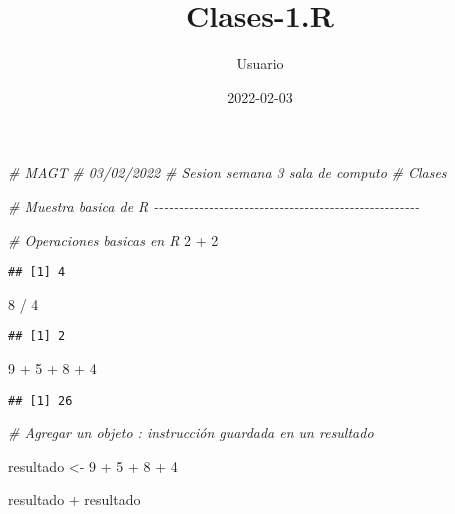 \documentclass[
]{article}
\title{Clases-1.R}
\author{Usuario}
\date{2022-02-03}
\newenvironment{Shaded}{\begin{snugshade}}{\end{snugshade}}
\newcommand{\CommentTok}[1]{\textcolor[rgb]{0.56,0.35,0.01}{\textit{#1}}}
\newcommand{\DecValTok}[1]{\textcolor[rgb]{0.00,0.00,0.81}{#1}}
\newcommand{\NormalTok}[1]{#1}
\newcommand{\OtherTok}[1]{\textcolor[rgb]{0.56,0.35,0.01}{#1}}
\newcommand{\SpecialCharTok}[1]{\textcolor[rgb]{0.00,0.00,0.00}{#1}}
\begin{document}
\maketitle

\begin{Shaded}
\begin{Highlighting}[]
\CommentTok{\# MAGT}
\CommentTok{\# 03/02/2022}
\CommentTok{\# Sesion semana 3 sala de computo }
\CommentTok{\# Clases}


\CommentTok{\# Muestra basica de R {-}{-}{-}{-}{-}{-}{-}{-}{-}{-}{-}{-}{-}{-}{-}{-}{-}{-}{-}{-}{-}{-}{-}{-}{-}{-}{-}{-}{-}{-}{-}{-}{-}{-}{-}{-}{-}{-}{-}{-}{-}{-}{-}{-}{-}{-}{-}{-}{-}{-}{-}{-}{-}}

\CommentTok{\# Operaciones basicas en R}
\DecValTok{2} \SpecialCharTok{+} \DecValTok{2} 
\end{Highlighting}
\end{Shaded}

\begin{verbatim}
## [1] 4
\end{verbatim}

\begin{Shaded}
\begin{Highlighting}[]
\DecValTok{8} \SpecialCharTok{/} \DecValTok{4}
\end{Highlighting}
\end{Shaded}

\begin{verbatim}
## [1] 2
\end{verbatim}

\begin{Shaded}
\begin{Highlighting}[]
\DecValTok{9} \SpecialCharTok{+} \DecValTok{5} \SpecialCharTok{+} \DecValTok{8} \SpecialCharTok{+} \DecValTok{4}
\end{Highlighting}
\end{Shaded}

\begin{verbatim}
## [1] 26
\end{verbatim}

\begin{Shaded}
\begin{Highlighting}[]
\CommentTok{\# Agregar un objeto : instrucción guardada en un resultado}

\NormalTok{resultado }\OtherTok{\textless{}{-}} \DecValTok{9} \SpecialCharTok{+} \DecValTok{5} \SpecialCharTok{+} \DecValTok{8} \SpecialCharTok{+} \DecValTok{4}

\NormalTok{resultado }\SpecialCharTok{+}\NormalTok{ resultado }
\end{Highlighting}
\end{Shaded}
\end{document}
